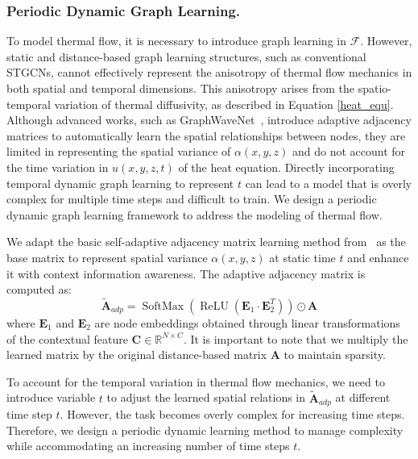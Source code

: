 \subsubsection{Periodic Dynamic Graph Learning.}
\label{sec:spatial_cycle}
To model thermal flow, it is necessary to introduce graph learning in $\mathcal{F}$. However, static and distance-based graph learning structures, such as conventional STGCNs, cannot effectively represent the anisotropy of thermal flow mechanics in both spatial and temporal dimensions. This anisotropy arises from the spatio-temporal variation of thermal diffusivity, as described in Equation \ref{heat_equ}. Although advanced works, such as GraphWaveNet~\cite{wu2019graph}, introduce adaptive adjacency matrices to automatically learn the spatial relationships between nodes, they are limited in representing the spatial variance of $\alpha(x, y, z)$ and do not account for the time variation in $u(x,y,z,t)$ of the heat equation. Directly incorporating temporal dynamic graph learning to represent $t$ can lead to a model that is overly complex for multiple time steps and difficult to train. We design a periodic dynamic graph learning framework to address the modeling of thermal flow.

 We adapt the basic self-adaptive adjacency matrix learning method from~\cite{wu2019graph} as the base matrix to represent spatial variance $\alpha(x, y, z)$ at static time $t$ and enhance it with context information awareness. The adaptive adjacency matrix is computed as:
\begin{equation}
\tilde{\mathbf{A}}_{a d p}=\operatorname{SoftMax}\left(\operatorname{ReLU}\left(\mathbf{E}_1 \cdot \mathbf{E}_2^T\right)\right) \odot \mathbf{A}
\end{equation}
where $\mathbf{E}_1$ and $\mathbf{E}_2$ are node embeddings obtained through linear transformations of the contextual feature $\mathbf{C} \in \mathbb{R}^{N \times C}$. It is important to note that we multiply the learned matrix by the original distance-based matrix $\mathbf{A}$ to maintain sparsity.

 To account for the temporal variation in thermal flow mechanics, we need to introduce variable $t$ to adjust the learned spatial relations in $\tilde{\mathbf{A}}_{a d p}$ at different time step $t$. However, the task becomes overly complex for increasing time steps. Therefore, we design a periodic dynamic learning method to manage complexity while accommodating an increasing number of time steps $t$.

